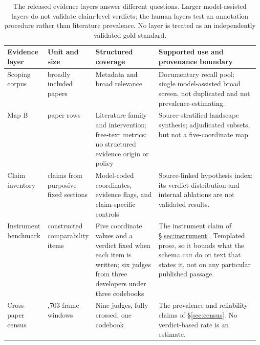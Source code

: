 \begin{table}[t]
\centering
\small
\renewcommand{\arraystretch}{0.95}
\begin{tabularx}{\linewidth}{>{\raggedright\arraybackslash}p{0.16\linewidth}>{\raggedright\arraybackslash}p{0.19\linewidth}>{\raggedright\arraybackslash}p{0.25\linewidth}>{\raggedright\arraybackslash}X}
\toprule
\textbf{Evidence layer} & \textbf{Unit and size} & \textbf{Structured coverage} & \textbf{Supported use and provenance boundary} \\
\midrule
Scoping corpus & 536 broadly included papers & Metadata and broad relevance & Documentary recall pool; single model-assisted broad screen, not duplicated and not prevalence-estimating. \\
Map B & 342 paper rows & Literature family and intervention; free-text metrics; no structured evidence origin or policy & Source-stratified landscape synthesis; adjudicated subsets, but not a five-coordinate map. \\
Claim inventory & 289 claims from purposive fixed sections & Model-coded coordinates, evidence flags, and claim-specific controls & Source-linked hypothesis index; its verdict distribution and internal ablations are not validated results. \\
Instrument benchmark & 360 constructed comparability items & Five coordinate values and a verdict fixed when each item is written; six judges from three developers under three codebooks & The instrument claim of \S\ref{sec:instrument}. Templated prose, so it bounds what the schema can do on text that states it, not on any particular published passage. \\
Cross-paper census & 1,703 frame windows & Nine judges, fully crossed, one codebook & The prevalence and reliability claims of \S\ref{sec:census}. No verdict-based rate is an estimate. \\
\bottomrule
\end{tabularx}
\caption{The released evidence layers answer different questions. Larger
model-assisted layers do not validate claim-level verdicts; the human layers
test an annotation procedure rather than literature prevalence. No layer is
treated as an independently validated gold standard.}
\label{tab:main-evidence-layers}
\end{table}
